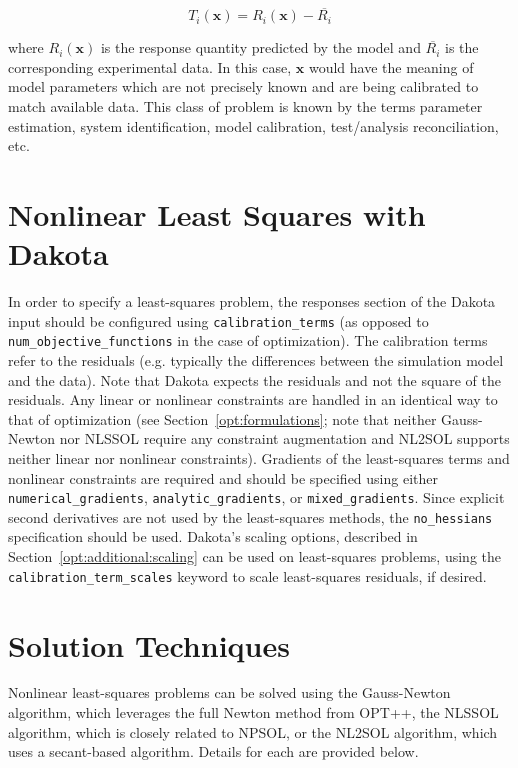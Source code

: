 \begin{equation}
  T_i(\mathbf{x}) = R_i(\mathbf{x})-\overline{R_i}
  \label{nls:equation03}
\end{equation}

where $R_i(\mathbf{x})$ is the response quantity predicted by the
model and $\overline{R_i}$ is the corresponding experimental data.
In this case, $\mathbf{x}$ would have the meaning of model parameters
which are not precisely known and are being calibrated to match
available data. This class of problem is known by the terms parameter
estimation, system identification, model calibration, test/analysis
reconciliation, etc.

\section{Nonlinear Least Squares with Dakota}

In order to specify a least-squares problem, the responses section of
the Dakota input should be configured using
\texttt{calibration\_terms} (as opposed to
\texttt{num\_objective\_functions} in the case of optimization).  The
calibration terms refer to the residuals (e.g. typically the
differences between the simulation model and the data).  Note that
Dakota expects the residuals and not the square of the residuals.  Any
linear or nonlinear constraints are handled in an identical way to
that of optimization (see Section~\ref{opt:formulations}; note that
neither Gauss-Newton nor NLSSOL require any constraint augmentation
and NL2SOL supports neither linear nor nonlinear constraints).
Gradients of the least-squares terms and nonlinear constraints are
required and should be specified using either
\texttt{numerical\_gradients}, \texttt{analytic\_gradients}, or
\texttt{mixed\_gradients}. Since explicit second derivatives are not
used by the least-squares methods, the \texttt{no\_hessians}
specification should be used.  Dakota's scaling options, described in
Section~\ref{opt:additional:scaling} can be used on least-squares
problems, using the \texttt{calibration\_term\_scales} keyword to
scale least-squares residuals, if desired.

\section{Solution Techniques}\label{nls:solution}

Nonlinear least-squares problems can be solved using the Gauss-Newton
algorithm, which leverages the full Newton method from OPT++, the
NLSSOL algorithm, which is closely related to NPSOL, or the NL2SOL
algorithm, which uses a secant-based algorithm. Details for each are
provided below.

